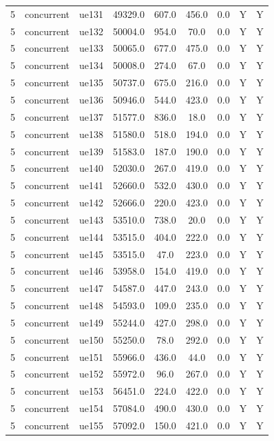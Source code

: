 \begin{table}[ht]
\begin{tabular}{|c|c|c|c|c|c|c|c|c|}
5 & concurrent & ue131 & 49329.0 & 607.0 & 456.0 & 0.0 & Y & Y \\
5 & concurrent & ue132 & 50004.0 & 954.0 & 70.0 & 0.0 & Y & Y \\
5 & concurrent & ue133 & 50065.0 & 677.0 & 475.0 & 0.0 & Y & Y \\
5 & concurrent & ue134 & 50008.0 & 274.0 & 67.0 & 0.0 & Y & Y \\
5 & concurrent & ue135 & 50737.0 & 675.0 & 216.0 & 0.0 & Y & Y \\
5 & concurrent & ue136 & 50946.0 & 544.0 & 423.0 & 0.0 & Y & Y \\
5 & concurrent & ue137 & 51577.0 & 836.0 & 18.0 & 0.0 & Y & Y \\
5 & concurrent & ue138 & 51580.0 & 518.0 & 194.0 & 0.0 & Y & Y \\
5 & concurrent & ue139 & 51583.0 & 187.0 & 190.0 & 0.0 & Y & Y \\
5 & concurrent & ue140 & 52030.0 & 267.0 & 419.0 & 0.0 & Y & Y \\
5 & concurrent & ue141 & 52660.0 & 532.0 & 430.0 & 0.0 & Y & Y \\
5 & concurrent & ue142 & 52666.0 & 220.0 & 423.0 & 0.0 & Y & Y \\
5 & concurrent & ue143 & 53510.0 & 738.0 & 20.0 & 0.0 & Y & Y \\
5 & concurrent & ue144 & 53515.0 & 404.0 & 222.0 & 0.0 & Y & Y \\
5 & concurrent & ue145 & 53515.0 & 47.0 & 223.0 & 0.0 & Y & Y \\
5 & concurrent & ue146 & 53958.0 & 154.0 & 419.0 & 0.0 & Y & Y \\
5 & concurrent & ue147 & 54587.0 & 447.0 & 243.0 & 0.0 & Y & Y \\
5 & concurrent & ue148 & 54593.0 & 109.0 & 235.0 & 0.0 & Y & Y \\
5 & concurrent & ue149 & 55244.0 & 427.0 & 298.0 & 0.0 & Y & Y \\
5 & concurrent & ue150 & 55250.0 & 78.0 & 292.0 & 0.0 & Y & Y \\
5 & concurrent & ue151 & 55966.0 & 436.0 & 44.0 & 0.0 & Y & Y \\
5 & concurrent & ue152 & 55972.0 & 96.0 & 267.0 & 0.0 & Y & Y \\
5 & concurrent & ue153 & 56451.0 & 224.0 & 422.0 & 0.0 & Y & Y \\
5 & concurrent & ue154 & 57084.0 & 490.0 & 430.0 & 0.0 & Y & Y \\
5 & concurrent & ue155 & 57092.0 & 150.0 & 421.0 & 0.0 & Y & Y \\

\end{tabular}
\end{table}

